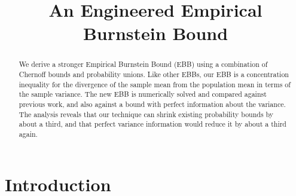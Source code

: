 \documentclass[aap,preprint]{imsart}
\begin{document}
\begin{frontmatter}

\title{An Engineered Empirical Burnstein Bound}

\begin{aug}
\author{ \corref{}
}
\address{Mark Alexander Burgess\\College of Engineering \& Computer Science\\Australian National University\\Canberra, ACT, Australia, 2600\\\\
}
\end{aug}


\begin{abstract}
We derive a stronger Empirical Burnstein Bound (EBB) using a combination of Chernoff bounds and probability unions.
Like other EBBs, our EBB is a concentration inequality for the divergence of the sample mean from the population mean in terms of the sample variance.
The new EBB is numerically solved and compared against previous work, and also against a bound with perfect information about the variance.
The analysis reveals that our technique can shrink existing probability bounds by about a third, and that perfect variance information would reduce it by about a third again.
\end{abstract}

\begin{keyword}[class=MSC]
\kwd[60E15]{}
\kwd[; 62H10]{}
\end{keyword}

\begin{keyword}
\end{keyword}

\end{frontmatter}






\section{Introduction}
\end{document}
